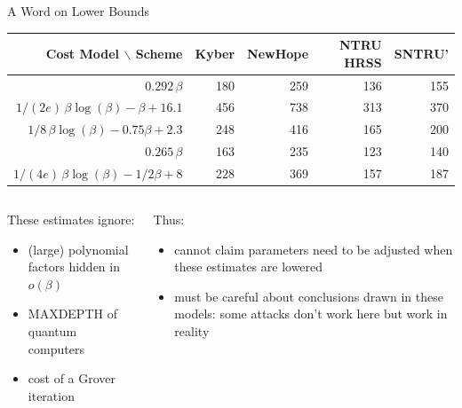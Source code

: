 \documentclass[xcolor=table,10pt,aspectratio=169]{beamer}
\def\enumworstfit{\(1/(2e)\, \beta \log(\beta) - \beta + 16.1\)}
\def\enumavgfit{\(1/8\,\beta \log(\beta) - 0.75\beta + 2.3\)}
\def\qenumworstfit{\(1/(4e)\, \beta \log(\beta) - 1/2\beta + 8\)}
\def\rore{\rowcolor{DarkRed!20}}
\begin{document}
\begin{frame}[label={sec:org5b5db11}]{A Word on Lower Bounds}
\begin{center}
\small{
\begin{tabular}{rrrrr}
\textbf{Cost Model} $\backslash$ \textbf{Scheme} & \textbf{Kyber} & \textbf{NewHope} & \textbf{NTRU HRSS} & \textbf{SNTRU'}\\
\hline
\rore \(0.292\,β\) & 180 & 259 & 136 & 155\\
\enumworstfit & 456 & 738 & 313 & 370\\
\rore \enumavgfit & 248 & 416 & 165 & 200\\
\hline
\rore \(0.265\,\beta\) & 163 & 235 & 123 & 140\\
\rore \qenumworstfit & 228 & 369 & 157 & 187\\
\end{tabular}
}
\end{center}

\begin{columns}[t]
\begin{column}{0.5\columnwidth}
These estimates ignore:

\begin{itemize}
\item (large) polynomial factors hidden in \(o(\beta)\)
\item MAXDEPTH of quantum computers
\item cost of a Grover iteration
\end{itemize}
\end{column}

\begin{column}{0.5\columnwidth}
Thus:

\begin{itemize}
\item cannot claim parameters need to be adjusted when these estimates are lowered
\item must be careful about conclusions drawn in these models: some attacks don’t work here but work in reality
\end{itemize}
\end{column}
\end{columns}
\end{frame}
\end{document}
